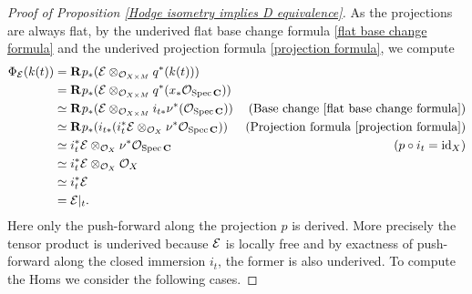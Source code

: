 \begin{proof}[Proof of Proposition \ref{Hodge isometry implies D equivalence}]
    As the projections are always flat, by the underived flat base change formula \ref{flat base change formula} and the underived projection formula \ref{projection formula}, we compute
    \begin{align*}
        \Phi_{\mathcal E}(k(t)) 
        &= \mathbf{R}^{}p_*(\mathcal E \otimes_{{\mathcal{O}_{X \times M}}} q^*(k(t))) \\
        & = \mathbf{R}^{}p_*(\mathcal E \otimes_{{\mathcal{O}_{X \times M}}} q^*(x_*{\mathcal{O}_{\operatorname{Spec}\mathbf C}})) \\
        & \simeq \mathbf{R}^{}p_*(\mathcal E \otimes_{{\mathcal{O}_{X \times M}}} i_{t*}\nu^*({\mathcal{O}_{\operatorname{Spec}\mathbf C}})) &\text{(Base change \ref{flat base change formula})}\\
        & \simeq \mathbf{R}^{}p_*(i_{t*}(i_t^*\mathcal E \otimes_{{\mathcal{O}_{X}}} \nu^*{\mathcal{O}_{\operatorname{Spec}\mathbf C}})) &\text{(Projection formula \ref{projection formula})}\\
        & \simeq i_t^*\mathcal E \otimes_{{\mathcal{O}_{X}}} \nu^*{\mathcal{O}_{\operatorname{Spec}\mathbf C}} &\text{($p \circ i_t = \operatorname{id}_{X}$)}\\
        & \simeq i_t^*\mathcal E \otimes_{{\mathcal{O}_{X}}} {\mathcal{O}_{X}} \\
        & \simeq i_t^*\mathcal E \\
        & = \mathcal E|_t.
    \end{align*}
    Here only the push-forward along the projection $p$ is derived. More precisely the tensor product is underived because $\mathcal E$ is locally free and by exactness of push-forward along the closed immersion $i_t$, the former is also underived. To compute the Homs we consider the following cases.


\end{proof}
